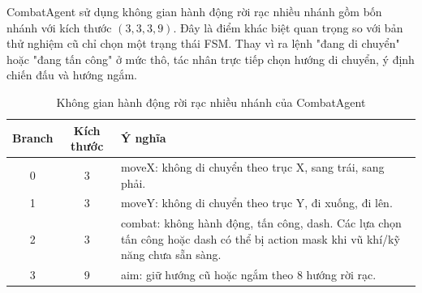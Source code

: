 CombatAgent sử dụng không gian hành động rời rạc nhiều nhánh gồm bốn nhánh với kích thước $(3,3,3,9)$. Đây là điểm khác biệt quan trọng so với bản thử nghiệm cũ chỉ chọn một trạng thái FSM. Thay vì ra lệnh "đang di chuyển" hoặc "đang tấn công" ở mức thô, tác nhân trực tiếp chọn hướng di chuyển, ý định chiến đấu và hướng ngắm.

\begin{table}[H]
    \centering
    \small
    \caption{Không gian hành động rời rạc nhiều nhánh của CombatAgent}
    \label{tab:action_space}
    \begin{tabular}{|c|c|p{9cm}|}
        \hline
        \textbf{Branch} & \textbf{Kích thước} & \textbf{Ý nghĩa} \\
        \hline
        0 & 3 & moveX: không di chuyển theo trục X, sang trái, sang phải. \\
        \hline
        1 & 3 & moveY: không di chuyển theo trục Y, đi xuống, đi lên. \\
        \hline
        2 & 3 & combat: không hành động, tấn công, dash. Các lựa chọn tấn công hoặc dash có thể bị action mask khi vũ khí/kỹ năng chưa sẵn sàng. \\
        \hline
        3 & 9 & aim: giữ hướng cũ hoặc ngắm theo 8 hướng rời rạc. \\
        \hline
    \end{tabular}
\end{table}

